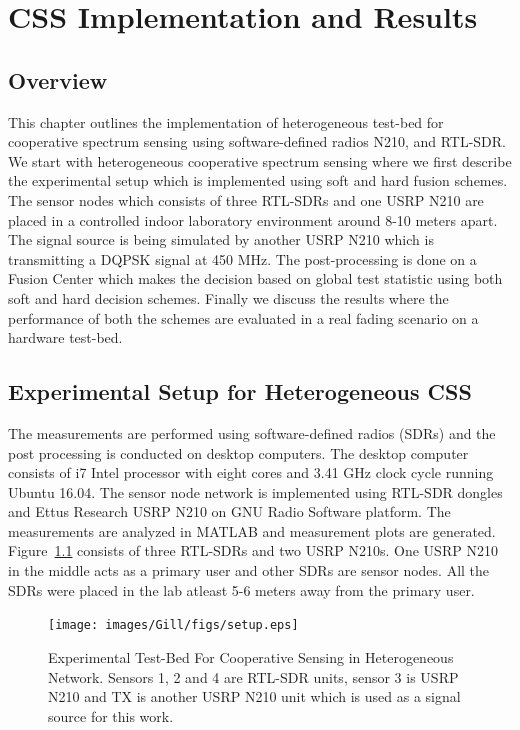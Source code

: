\chapter{CSS Implementation and Results}
\label{chapter5}

\section{Overview}
This chapter outlines the implementation of heterogeneous test-bed for cooperative spectrum sensing using software-defined radios N210, and RTL-SDR. We start with heterogeneous cooperative spectrum sensing where we first describe the experimental setup which is implemented using soft and hard fusion schemes. The sensor nodes which consists of three RTL-SDRs and one USRP N210 are placed in a controlled indoor laboratory environment around 8-10 meters apart. The signal source is being simulated by another USRP N210 which is transmitting a DQPSK signal at 450 MHz. The post-processing is done on a Fusion Center which makes the decision based on global test statistic using both soft and hard decision schemes. Finally we discuss the results where the performance of both the schemes are evaluated in a real fading scenario on a hardware test-bed. 

\section{Experimental Setup for Heterogeneous CSS}

The measurements are performed using software-defined radios (SDRs) and the post processing is conducted on desktop computers. The desktop computer consists of i7 Intel processor with eight cores and 3.41 GHz clock cycle running Ubuntu 16.04. The sensor node network is implemented using RTL-SDR dongles and Ettus Research USRP N210 on GNU Radio Software platform. The measurements are analyzed in MATLAB and measurement plots are generated. Figure~\ref{expsetup} consists of three RTL-SDRs and two USRP N210s. One USRP N210 in the middle acts as a primary user and other SDRs are sensor nodes. All the SDRs were placed in the lab atleast 5-6  meters away from the primary user.

\begin{figure}
\centering
	\texttt{[image: images/Gill/figs/setup.eps]} 
\caption{Experimental Test-Bed For Cooperative Sensing in Heterogeneous Network. Sensors 1, 2 and 4 are RTL-SDR units, sensor 3 is USRP N210 and TX is another USRP N210 unit which is used as a signal source for this work.}
\label{expsetup}
\end{figure}

